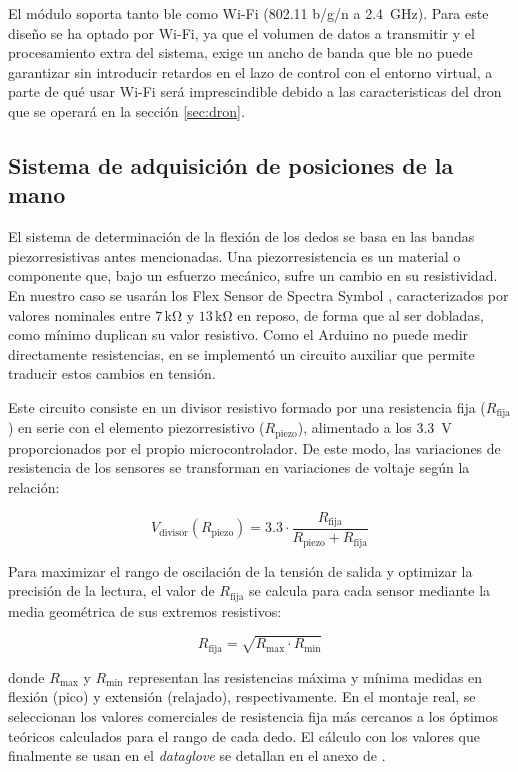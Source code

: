 \documentclass[12pt]{article}
\begin{document}
El módulo soporta tanto \gls{ble} como Wi-Fi (802.11 b/g/n a 2.4~GHz). Para este diseño se ha optado por Wi-Fi, ya que el volumen de datos a transmitir y el procesamiento extra del sistema, exige un ancho de banda que \gls{ble} no puede garantizar sin introducir retardos en el lazo de control con el entorno virtual, a parte de qué usar Wi-Fi será imprescindible debido a las caracteristicas del dron que se operará en la sección \ref{sec:dron}.

\subsection{Sistema de adquisición de posiciones de la mano}
El sistema de determinación de la flexión de los dedos se basa en las bandas piezorresistivas antes mencionadas. Una piezorresistencia es un material o componente que, bajo un esfuerzo mecánico, sufre un cambio en su resistividad. En nuestro caso se usarán los Flex Sensor de Spectra Symbol \cite{Flex-Sensor}, caracterizados por valores nominales entre $7\,\mathrm{k\Omega}$ y $13\,\mathrm{k\Omega}$ en reposo, de forma que al ser dobladas, como mínimo duplican su valor resistivo. Como el Arduino no puede medir directamente resistencias, en \cite{TFG} se implementó un circuito auxiliar que permite traducir estos cambios en tensión.

Este circuito consiste en un divisor resistivo formado por una resistencia fija ($R_{\text{fija}}$) en serie con el elemento piezorresistivo ($R_{\text{piezo}}$), alimentado a los 3.3~V proporcionados por el propio microcontrolador. De este modo, las variaciones de resistencia de los sensores se transforman en variaciones de voltaje según la relación:

\begin{equation}
V_{\text{divisor}}(R_{\text{piezo}}) = 3.3 \cdot \frac{R_{\text{fija}}}{R_{\text{piezo}} + R_{\text{fija}}}
\end{equation}

Para maximizar el rango de oscilación de la tensión de salida y optimizar la precisión de la lectura, el valor de $R_{\text{fija}}$ se calcula para cada sensor mediante la media geométrica de sus extremos resistivos:

\begin{equation}
R_{\text{fija}} = \sqrt{R_{\text{max}} \cdot R_{\text{min}}}
\end{equation}

donde $R_{\text{max}}$ y $R_{\text{min}}$ representan las resistencias máxima y mínima medidas en flexión (pico) y extensión (relajado), respectivamente. En el montaje real, se seleccionan los valores comerciales de resistencia fija más cercanos a los óptimos teóricos calculados para el rango de cada dedo. El cálculo con los valores que finalmente se usan en el \textit{dataglove} se detallan en el anexo de \cite{TFG}.
\end{document}
